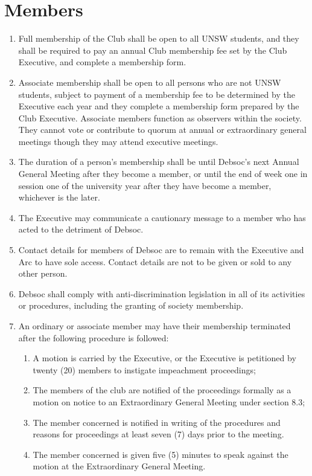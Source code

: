 \newpage
\section{Members}

\begin{enumerate}
\item Full membership of the Club shall be open to all UNSW students, and they shall be required to pay an annual Club membership fee set by the Club Executive, and complete a membership form.
\item Associate membership shall be open to all persons who are not UNSW students, subject to payment of a membership fee to be determined by the Executive each year and they complete a membership form prepared by the Club Executive. Associate members function as observers within the society. They cannot vote or contribute to quorum at annual or extraordinary general meetings though they may attend executive meetings.
\item The duration of a person’s membership shall be until Debsoc’s next Annual General Meeting after they become a member, or until the end of week one in session one of the university year after they have become a member, whichever is the later.
\item The Executive may communicate a cautionary message to a member who has acted to the detriment of Debsoc.
\item Contact details for members of Debsoc are to remain with the Executive and Arc to have sole access. Contact details are not to be given or sold to any other person.
\item Debsoc shall comply with anti-discrimination legislation in all of its activities or procedures, including the granting of society membership.
\item An ordinary or associate member may have their membership terminated after the following procedure is followed:
  \begin{enumerate}
  \item A motion is carried by the Executive, or the Executive is petitioned by twenty (20) members to instigate impeachment proceedings;
  \item The members of the club are notified of the proceedings formally as a motion on notice to an Extraordinary General Meeting under section 8.3;
  \item The member concerned is notified in writing of the procedures and reasons for proceedings at least seven (7) days prior to the meeting.
  \item The member concerned is given five (5) minutes to speak against the motion at the Extraordinary General Meeting.

\end{enumerate}
\end{enumerate}
